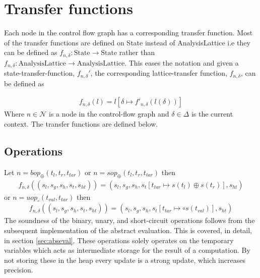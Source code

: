 \section{Transfer functions}
\label{sec:transferf}
\newcommand{\letin}[1]{\texttt{let } #1 \texttt{in }}
\newcommand{\ifelse}[3]{\texttt{if }#1\texttt{ then } #2 \texttt{ else } #3}
\newcommand{\match}[1]{\texttt{match }#1}
\newcommand{\with}[1]{\texttt{with }#1\text{: }}
\newcommand{\coerce}[2]{c_{\text{#1}, \text{#2}}}
\newcommand{\default}{\texttt{default: }}
Each node in the control flow graph has a corresponding transfer function. Most of the transfer functions are defined on { State} instead of {AnalysisLattice} i.e they can be defined as $f_{n,\delta} : \text{State} \rightarrow \text{State}$ rather than $f_{n,\delta} : \text{AnalysisLattice} \rightarrow \text{AnalysisLattice}$. This eases the notation and given a state-transfer-function, $f_{n,\delta}'$, the corresponding lattice-transfer function, $f_{n,\delta}$, can be defined as

\begin{align}
f_{n,\delta}(l) = l[\delta\mapsto f'_{n, \delta}(l(\delta))]
\end{align}
Where $n\in\mathcal{N}$ is a node in the control-flow graph and $\delta\in \Delta$ is the current context. The transfer functions are defined below.

\subsection{Operations}
Let $n = \mathit{bop}_\oplus(t_l,t_r,t_{tar})$ or $n =  \mathit{sop}_\oplus(t_l,t_r,t_{tar})$ then 
\begin{align}
f_{n,\delta}((s_l, s_g, s_h, s_t, s_{ht})) = (s_l, s_g, s_h, s_t[t_{tar}\mapsto s(t_l)\oplus s(t_r)], s_{ht})
\end{align}
or $n = uop_\circ(t_{val},t_{tar})$ then
\begin{align}
f_{n,\delta}((s_l, s_g, s_h, s_t, s_{ht})) = (s_l, s_g, s_h, s_t[t_{tar}\mapsto \circ s(t_{val})], s_{ht})
\end{align}
The soundness of the binary, unary, and short-circuit operations follows from the subsequent implementation of the abstract evaluation. This is covered, in detail, in section \ref{sec:abseval}. These operations solely operates on the temporary variables which acts as intermediate storage for the result of a computation.  By not storing these in the heap every update is a strong update, which increases precision.

